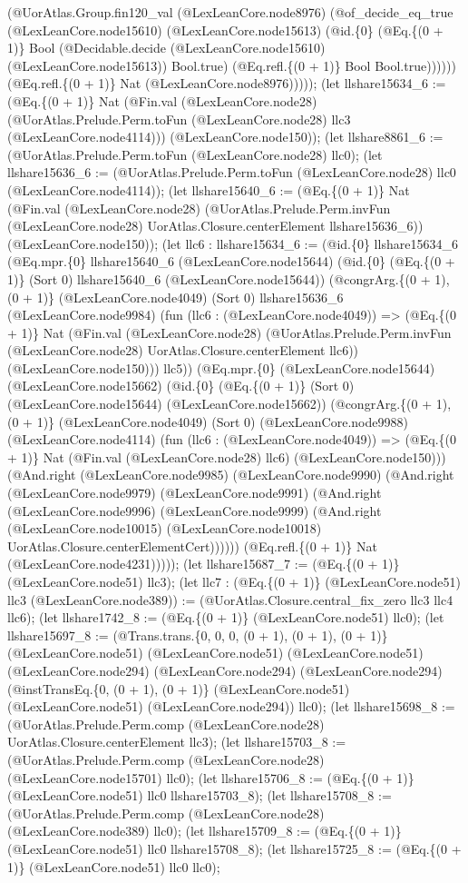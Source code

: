 \documentclass[11pt]{article}
\begin{document}
(@UorAtlas.Group.fin120\_val (@LexLeanCore.node8976) (@of\_decide\_eq\_true (@LexLeanCore.node15610) (@LexLeanCore.node15613) (@id.\{0\} (@Eq.\{(0 + 1)\} Bool (@Decidable.decide (@LexLeanCore.node15610) (@LexLeanCore.node15613)) Bool.true) (@Eq.refl.\{(0 + 1)\} Bool Bool.true)))))) (@Eq.refl.\{(0 + 1)\} Nat (@LexLeanCore.node8976))))); (let llshare15634\_6 := (@Eq.\{(0 + 1)\} Nat (@Fin.val (@LexLeanCore.node28) (@UorAtlas.Prelude.Perm.toFun (@LexLeanCore.node28) llc3 (@LexLeanCore.node4114))) (@LexLeanCore.node150)); (let llshare8861\_6 := (@UorAtlas.Prelude.Perm.toFun (@LexLeanCore.node28) llc0); (let llshare15636\_6 := (@UorAtlas.Prelude.Perm.toFun (@LexLeanCore.node28) llc0 (@LexLeanCore.node4114)); (let llshare15640\_6 := (@Eq.\{(0 + 1)\} Nat (@Fin.val (@LexLeanCore.node28) (@UorAtlas.Prelude.Perm.invFun (@LexLeanCore.node28) UorAtlas.Closure.centerElement llshare15636\_6)) (@LexLeanCore.node150)); (let llc6 : llshare15634\_6 := (@id.\{0\} llshare15634\_6 (@Eq.mpr.\{0\} llshare15640\_6 (@LexLeanCore.node15644) (@id.\{0\} (@Eq.\{(0 + 1)\} (Sort 0) llshare15640\_6 (@LexLeanCore.node15644)) (@congrArg.\{(0 + 1), (0 + 1)\} (@LexLeanCore.node4049) (Sort 0) llshare15636\_6 (@LexLeanCore.node9984) (fun (llc6 : (@LexLeanCore.node4049)) => (@Eq.\{(0 + 1)\} Nat (@Fin.val (@LexLeanCore.node28) (@UorAtlas.Prelude.Perm.invFun (@LexLeanCore.node28) UorAtlas.Closure.centerElement llc6)) (@LexLeanCore.node150))) llc5)) (@Eq.mpr.\{0\} (@LexLeanCore.node15644) (@LexLeanCore.node15662) (@id.\{0\} (@Eq.\{(0 + 1)\} (Sort 0) (@LexLeanCore.node15644) (@LexLeanCore.node15662)) (@congrArg.\{(0 + 1), (0 + 1)\} (@LexLeanCore.node4049) (Sort 0) (@LexLeanCore.node9988) (@LexLeanCore.node4114) (fun (llc6 : (@LexLeanCore.node4049)) => (@Eq.\{(0 + 1)\} Nat (@Fin.val (@LexLeanCore.node28) llc6) (@LexLeanCore.node150))) (@And.right (@LexLeanCore.node9985) (@LexLeanCore.node9990) (@And.right (@LexLeanCore.node9979) (@LexLeanCore.node9991) (@And.right (@LexLeanCore.node9996) (@LexLeanCore.node9999) (@And.right (@LexLeanCore.node10015) (@LexLeanCore.node10018) UorAtlas.Closure.centerElementCert)))))) (@Eq.refl.\{(0 + 1)\} Nat (@LexLeanCore.node4231))))); (let llshare15687\_7 := (@Eq.\{(0 + 1)\} (@LexLeanCore.node51) llc3); (let llc7 : (@Eq.\{(0 + 1)\} (@LexLeanCore.node51) llc3 (@LexLeanCore.node389)) := (@UorAtlas.Closure.central\_fix\_zero llc3 llc4 llc6); (let llshare1742\_8 := (@Eq.\{(0 + 1)\} (@LexLeanCore.node51) llc0); (let llshare15697\_8 := (@Trans.trans.\{0, 0, 0, (0 + 1), (0 + 1), (0 + 1)\} (@LexLeanCore.node51) (@LexLeanCore.node51) (@LexLeanCore.node51) (@LexLeanCore.node294) (@LexLeanCore.node294) (@LexLeanCore.node294) (@instTransEq.\{0, (0 + 1), (0 + 1)\} (@LexLeanCore.node51) (@LexLeanCore.node51) (@LexLeanCore.node294)) llc0); (let llshare15698\_8 := (@UorAtlas.Prelude.Perm.comp (@LexLeanCore.node28) UorAtlas.Closure.centerElement llc3); (let llshare15703\_8 := (@UorAtlas.Prelude.Perm.comp (@LexLeanCore.node28) (@LexLeanCore.node15701) llc0); (let llshare15706\_8 := (@Eq.\{(0 + 1)\} (@LexLeanCore.node51) llc0 llshare15703\_8); (let llshare15708\_8 := (@UorAtlas.Prelude.Perm.comp (@LexLeanCore.node28) (@LexLeanCore.node389) llc0); (let llshare15709\_8 := (@Eq.\{(0 + 1)\} (@LexLeanCore.node51) llc0 llshare15708\_8); (let llshare15725\_8 := (@Eq.\{(0 + 1)\} (@LexLeanCore.node51) llc0 llc0); 
\end{document}
